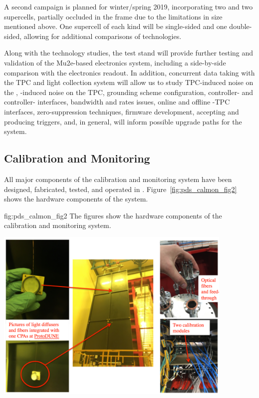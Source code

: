 A second campaign is planned for winter/spring 2019, incorporating two  and two  supercells, partially occluded in the frame due to the limitations in  size mentioned above.  One supercell of each kind will be single-sided and one double-sided, allowing for additional comparisons of  technologies.

Along with the  technology studies, the test stand will  provide further testing and validation of the  Mu2e-based electronics system, including a side-by-side comparison with the   electronics readout. In addition, concurrent data taking with the TPC and light collection system will allow us to study TPC-induced noise on the , -induced noise on the TPC, grounding scheme configuration, controller- and controller- interfaces, bandwidth and rates issues, online and offline -TPC interfaces, zero-suppression techniques, firmware development, accepting and producing triggers, and, in general, will inform possible upgrade paths for the system. 


\subsection{Calibration and Monitoring}
\label{sec:fdsp-pd-validation-candm}


All major components of the   calibration and monitoring system have been designed, fabricated, tested, and operated in .
Figure~\ref{fig:pds_calmon_fig2} shows the hardware components of the system.

 \begin{dunefigure}
 {fig:pds_calmon_fig2}
 {The figures show the hardware components of the  calibration and monitoring system.}
 \includegraphics[angle=0,width=11.4cm,height=9cm]{graphics/pds-calmon-fig2.png}
\end{dunefigure}

